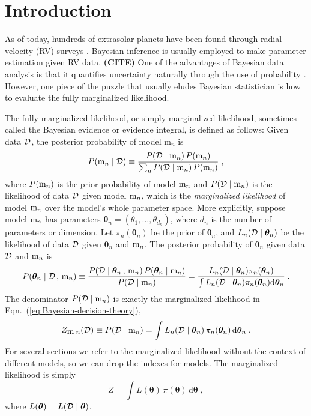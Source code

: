 \documentclass[letterpaper, preprint]{aastex}
\newcommand{\bth} {\boldsymbol \theta}
\newcommand{\md}{\mathrm{d}}
\newcommand{\qer}[1]{{\bf{\color{red}#1}}}
\begin{document}

\section{Introduction}

As of today, hundreds of extrasolar planets have been found through radial velocity (RV) surveys \citep{mitchell13a}. Bayesian inference is usually employed to make parameter estimation given RV data. \qer{(CITE)} One of the advantages of Bayesian data analysis is that it quantifies uncertainty naturally through the use of probability \citep{gelman04a}. However, one piece of the puzzle that usually eludes Bayesian statistician is how to evaluate the fully marginalized likelihood.

The fully marginalized likelihood, or simply marginalized likelihood, sometimes called the Bayesian evidence or evidence integral, is defined as follows: Given data $\cal D$, the posterior probability of model $\mathrm{m}_n$ is
\begin{equation}
P(\mathrm{m}_n\mid{\cal D}) \equiv \frac{P({\cal D}\mid\mathrm{m}_n)\,P(\mathrm{m}_n)}{\sum_n{P({\cal D}\mid\mathrm{m}_n)\,P(\mathrm{m}_n)}}\; ,
\label{eq:Bayesian-decision-theory}
\end{equation}
where $P( {\mbox m}_n)$ is the prior probability of model ${\mbox m}_n$ and $P({\cal D}\mid {\mbox m}_n)$ is the likelihood of data $\cal D$ given model ${\mbox m}_n$, which is the \emph{marginalized likelihood} of model ${\mbox m}_n$ over the model's whole parameter space. More explicitly, suppose model ${\mbox m}_n$ has parameters $\bth_n = (\theta_1,\ldots,\theta_{d_n})$, where $d_n$ is the number of parameters or dimension. Let $\pi_n(\bth_n)$ be the prior of $\bth_n$, and $L_n({\cal D}\mid\bth_n)$ be the likelihood of data $\cal D$ given $\bth_n$ and ${\mbox m}_n$. The posterior probability of $\bth_n$ given data $\cal D$ and ${\mbox m}_n$ is
\begin{equation}
P(\bth_n\mid{\cal D}\, ,\,  {\mbox m}_n) \equiv \frac{P({\cal D}\mid\bth_n\, , \, {\mbox m}_n)\,P(\bth_n\mid {\mbox m}_n)}{P({\cal D}\mid  {\mbox m}_n)} = \frac{L_n({\cal D}\mid\bth_n)\pi_n(\bth_n)}{\int{L_n({\cal D}\mid\bth_n)\pi_n(\bth_n)\md\bth_n}}\; .
\label{eq:Bayesian-posterior}
\end{equation}
The denominator $P({\cal D}\mid {\mbox m}_n)$ is exactly the marginalized likelihood in Eqn.~(\ref{eq:Bayesian-decision-theory}),
\begin{equation*}
Z_{ {\mbox m}\;n}({\cal D}) \equiv P({\cal D}\mid {\mbox m}_n) = \int L_n({\cal D}\mid \bth_n)\, \pi_n(\bth_n) \,\md\bth_n \; .
\end{equation*}
For several sections we refer to the marginalized likelihood without the context of different models, so we can drop the indexes for models. The marginalized likelihood is simply
\begin{equation}
Z = \int\! L(\bth)\,\pi(\bth)\,\md\bth\; ,
\label{eq:evidence-integral}
\end{equation}
where $L(\bth)=L({\cal D}\mid \bth)$. 
\end{document}
